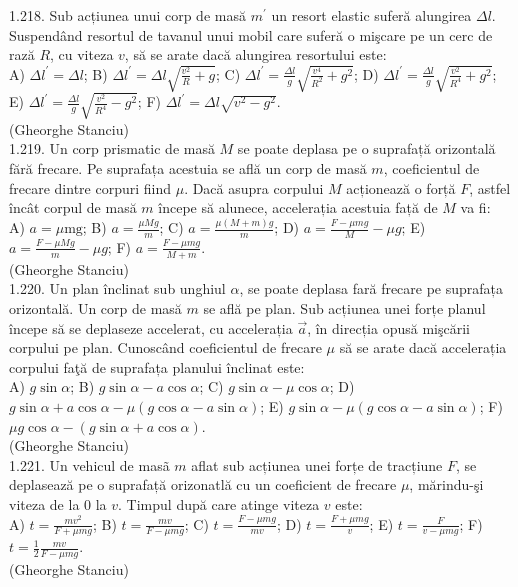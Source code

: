 1.218. Sub acțiunea unui corp de masă $m^{\prime}$ un resort elastic suferă alungirea $\Delta l$. Suspendând resortul de tavanul unui mobil care suferă o mişcare pe un cerc de rază $R$, cu viteza $v$, să se arate dacă alungirea resortului este:\\ A) $\Delta l^{\prime}=\Delta l$; B) $\Delta l^{\prime}=\Delta l \sqrt{\frac{v^{2}}{R}+g}$; C) $\Delta l^{\prime}=\frac{\Delta l}{g} \sqrt{\frac{v^{4}}{R^{2}}+g^{2}}$; D) $\Delta l^{\prime}=\frac{\Delta l}{g} \sqrt{\frac{v^{2}}{R^{4}}+g^{2}}$; E) $\Delta l^{\prime}=\frac{\Delta l}{g} \sqrt{\frac{v^{2}}{R^{4}}-g^{2}}$; F) $\Delta l^{\prime}=\Delta l \sqrt{v^{2}-g^{2}}$.\\ (Gheorghe Stanciu)\\

1.219. Un corp prismatic de masă $M$ se poate deplasa pe o suprafață orizontală fără frecare. Pe suprafața acestuia se află un corp de masă $m$, coeficientul de frecare dintre corpuri fiind $\mu$. Dacă asupra corpului $M$ acționează o forță $F$, astfel încât corpul de masă $m$ începe să alunece, accelerația acestuia față de $M$ va fi:\\ A) $a=\mu \mathrm{mg}$; B) $a=\frac{\mu M g}{m}$; C) $a=\frac{\mu(M+m) g}{m}$; D) $a=\frac{F-\mu m g}{M}-\mu g$; E) $a=\frac{F-\mu M g}{m}-\mu g$; F) $a=\frac{F-\mu m g}{M+m}$.\\ (Gheorghe Stanciu)\\

1.220. Un plan înclinat sub unghiul $\alpha$, se poate deplasa fară frecare pe suprafața orizontală. Un corp de masă $m$ se află pe plan. Sub acțiunea unei forțe planul începe să se deplaseze accelerat, cu accelerația $\vec{a}$, în direcția opusă mişcării corpului pe plan. Cunoscând coeficientul de frecare $\mu$ să se arate dacă accelerația corpului faţă de suprafața planului înclinat este:\\ A) $g \sin \alpha$; B) $g \sin \alpha-a \cos \alpha$; C) $g \sin \alpha-\mu \cos \alpha$; D) $g \sin \alpha+a \cos \alpha-\mu(g \cos \alpha-a \sin \alpha)$; E) $g \sin \alpha-\mu(g \cos \alpha-a \sin \alpha)$; F) $\mu g \cos \alpha-(g \sin \alpha+a \cos \alpha)$.\\ (Gheorghe Stanciu)\\

1.221. Un vehicul de masã $m$ aflat sub acțiunea unei forțe de tracțiune $F$, se deplasează pe o suprafață orizonatlă cu un coeficient de frecare $\mu$, mărindu-şi viteza de la $0$ la $v$. Timpul după care atinge viteza $v$ este:\\ A) $t=\frac{m v^{2}}{F+\mu m g}$; B) $t=\frac{m v}{F-\mu m g}$; C) $t=\frac{F-\mu m g}{m v}$; D) $t=\frac{F+\mu m g}{v}$; E) $t=\frac{F}{v-\mu m g}$; F) $t=\frac{1}{2} \frac{m v}{F-\mu m g}$.\\ (Gheorghe Stanciu)\\

